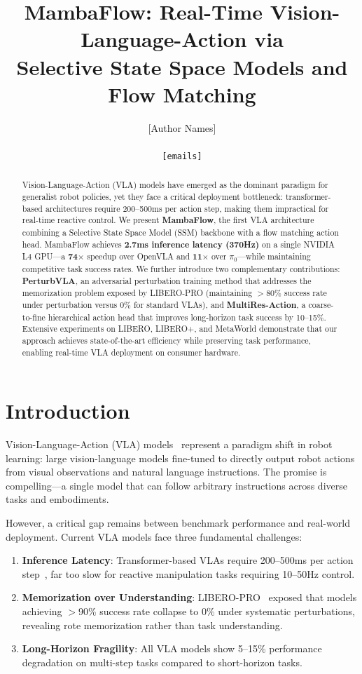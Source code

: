 \documentclass[11pt]{article}
\title{MambaFlow: Real-Time Vision-Language-Action via\\
Selective State Space Models and Flow Matching}
\author{
  [Author Names]\\
  [Affiliations]\\
  \texttt{[emails]}
}
\begin{document}
\maketitle

\begin{abstract}
Vision-Language-Action (VLA) models have emerged as the dominant paradigm for generalist robot policies, yet they face a critical deployment bottleneck: transformer-based architectures require 200--500ms per action step, making them impractical for real-time reactive control. We present \textbf{MambaFlow}, the first VLA architecture combining a Selective State Space Model (SSM) backbone with a flow matching action head. MambaFlow achieves \textbf{2.7ms inference latency (370Hz)} on a single NVIDIA L4 GPU---a \textbf{74$\times$} speedup over OpenVLA and \textbf{11$\times$} over $\pi_0$---while maintaining competitive task success rates. We further introduce two complementary contributions: \textbf{PerturbVLA}, an adversarial perturbation training method that addresses the memorization problem exposed by LIBERO-PRO (maintaining $>$80\% success rate under perturbation versus 0\% for standard VLAs), and \textbf{MultiRes-Action}, a coarse-to-fine hierarchical action head that improves long-horizon task success by 10--15\%. Extensive experiments on LIBERO, LIBERO+, and MetaWorld demonstrate that our approach achieves state-of-the-art efficiency while preserving task performance, enabling real-time VLA deployment on consumer hardware.
\end{abstract}

\section{Introduction}

Vision-Language-Action (VLA) models~\cite{brohan2023rt2,kim2024openvla,black2024pi0} represent a paradigm shift in robot learning: large vision-language models fine-tuned to directly output robot actions from visual observations and natural language instructions. The promise is compelling---a single model that can follow arbitrary instructions across diverse tasks and embodiments.

However, a critical gap remains between benchmark performance and real-world deployment. Current VLA models face three fundamental challenges:

\begin{enumerate}
    \item \textbf{Inference Latency}: Transformer-based VLAs require 200--500ms per action step~\cite{kim2024openvla}, far too slow for reactive manipulation tasks requiring 10--50Hz control.
    \item \textbf{Memorization over Understanding}: LIBERO-PRO~\cite{liberopro2025} exposed that models achieving $>$90\% success rate collapse to 0\% under systematic perturbations, revealing rote memorization rather than task understanding.
    \item \textbf{Long-Horizon Fragility}: All VLA models show 5--15\% performance degradation on multi-step tasks compared to short-horizon tasks.
\end{enumerate}
\end{document}

